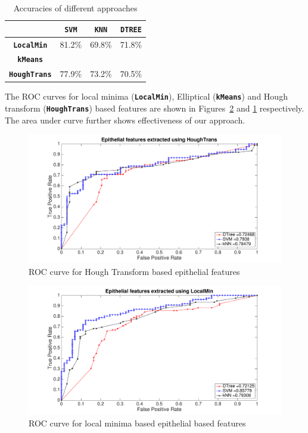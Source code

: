 \begin{table}
\centering
\begin{tabular}{|c|c|c|c| }
\hline
 & \textbf{\texttt{SVM}} & \textbf{\texttt{KNN}} & \textbf{\texttt{DTREE}} \\ \hline
\textbf{\texttt{LocalMin}} & 81.2\% & 69.8\% & 71.8\% \\ \hline
\textbf{\texttt{kMeans}} &   &  &  \\ \hline
\textbf{ \texttt{HoughTrans}} & 77.9\% & 73.2\% & 70.5\% \\ \hline
\end{tabular}
\caption{\label{table:accuracy}Accuracies of different approaches}
\end{table}

The ROC curves for local minima (\textbf{\texttt{LocalMin}}), Elliptical (\textbf{\texttt{kMeans}}) and Hough transform (\textbf{\texttt{HoughTrans}}) based features are shown in Figures~\ref{fig:ROC_localMin} and \ref{fig:ROC_circleConv} respectively. The area under curve further shows effectiveness of our approach. 


\begin{figure}
\includegraphics[scale=0.2]{figs/ROC_circleConv.pdf}
\caption{\label{fig:ROC_circleConv}ROC curve for Hough Transform based  epithelial features}
\end{figure}  

\begin{figure}
\includegraphics[scale=0.2]{figs/ROC_localMin.pdf}
\caption{\label{fig:ROC_localMin}ROC curve for local minima based epithelial based features}
\end{figure}  

